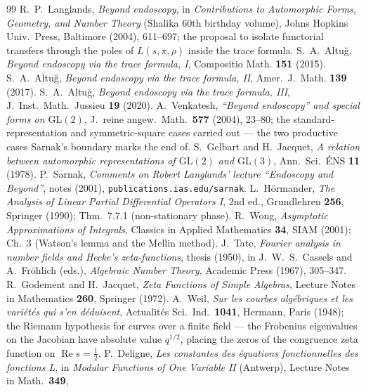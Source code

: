 \documentclass[11pt]{article}
\theoremstyle{definition}
\renewcommand{\Re}{\operatorname{Re}}
\begin{document}
\begin{thebibliography}{99}
 R.~P.~Langlands, \emph{Beyond endoscopy}, in \emph{Contributions to Automorphic
Forms, Geometry, and Number Theory} (Shalika 60th birthday volume), Johns Hopkins Univ.\ Press,
Baltimore (2004), 611--697; the proposal to isolate functorial transfers through the poles of
$L(s,\pi,\rho)$ inside the trace formula.
 S.~A.~Altu\u{g}, \emph{Beyond endoscopy via the trace formula, I}, Compositio Math.
\textbf{151} (2015).
 S.~A.~Altu\u{g}, \emph{Beyond endoscopy via the trace formula, II}, Amer.\ J.\ Math.
\textbf{139} (2017).
 S.~A.~Altu\u{g}, \emph{Beyond endoscopy via the trace formula, III}, J.\ Inst.\
Math.\ Jussieu \textbf{19} (2020).
 A.~Venkatesh, \emph{``Beyond endoscopy'' and special forms on
$\mathrm{GL}(2)$}, J.\ reine angew.\ Math.\ \textbf{577} (2004), 23--80; the standard-representation
and symmetric-square cases carried out --- the two productive cases Sarnak's boundary marks the end of.
\bibitem{GJ} S.~Gelbart and H.~Jacquet, \emph{A relation between automorphic representations of
$\mathrm{GL}(2)$ and $\mathrm{GL}(3)$}, Ann.\ Sci.\ \'ENS \textbf{11} (1978).
\bibitem{Sar} P.~Sarnak, \emph{Comments on Robert Langlands' lecture ``Endoscopy and Beyond''}, notes
(2001), \texttt{publications.ias.edu/sarnak}.
 L.~H\"ormander, \emph{The Analysis of Linear Partial Differential Operators I},
2nd ed., Grundlehren \textbf{256}, Springer (1990); Thm.~7.7.1 (non-stationary phase).
\bibitem{Wong} R.~Wong, \emph{Asymptotic Approximations of Integrals}, Classics in Applied
Mathematics \textbf{34}, SIAM (2001); Ch.~3 (Watson's lemma and the Mellin method).
\bibitem{Tate} J.~Tate, \emph{Fourier analysis in number fields and Hecke's zeta-functions}, thesis
(1950), in J.~W.~S.~Cassels and A.~Fr\"ohlich (eds.), \emph{Algebraic Number Theory}, Academic Press
(1967), 305--347.
 R.~Godement and H.~Jacquet, \emph{Zeta Functions of Simple Algebras}, Lecture Notes in
Mathematics \textbf{260}, Springer (1972).
 A.~Weil, \emph{Sur les courbes alg\'ebriques et les vari\'et\'es qui s'en
d\'eduisent}, Actualit\'es Sci.\ Ind.\ \textbf{1041}, Hermann, Paris (1948); the Riemann hypothesis
for curves over a finite field --- the Frobenius eigenvalues on the Jacobian have absolute value
$q^{1/2}$, placing the zeros of the congruence zeta function on $\Re s=\tfrac12$.
\bibitem{Deligne} P.~Deligne, \emph{Les constantes des \'equations fonctionnelles des fonctions L},
in \emph{Modular Functions of One Variable II} (Antwerp), Lecture Notes in Math.\ \textbf{349},

\end{thebibliography}
\end{document}
